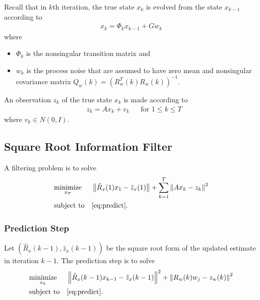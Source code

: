 \documentclass[microtype]{gtpart}     %
\theoremstyle{definition}
\newcommand{\norm}[1]{\left\lVert#1\right\rVert}
\begin{document}
Recall that in $k$th iteration, the true state $x_k$ is evolved from the state $x_{k-1}$ according to
\begin{align}
x_k = \Phi_k x_{k-1} + Gw_k \label{eq:predict}
\end{align}
where
\begin{itemize}
	\item $\Phi_k$ is the nonsingular transition matrix and
	\item $w_k$ is the process noise that are assumed to have zero mean and nonsingular covariance matrix 
	$Q_w(k)=(R^T_w(k)R_w(k))^{-1}$.
\end{itemize}
An observation $z_k$ of the true state $x_k$ is made according to
\begin{align*}
	&z_k = A x_k + v_k & &\text{for } 1\leq k \leq T
\end{align*}
where $v_k \in N(0, I)$.

\subsection{Square Root Information Filter}

A filtering problem is to solve
\begin{align*}
& \underset{x_T}{\text{minimize}} & & \norm{\tilde{R}_x(1)x_1 - \tilde{z}_x(1)} + \sum_{k=1}^{T}\norm{Ax_k - z_k}^2 \\
& \text{subject to} & & \autoref{eq:predict}.
\end{align*}

\subsubsection{Prediction Step}

Let $(\hat{R}_x(k-1), \hat{z}_x(k-1))$ be the square root form of the updated estimate in iteration $k-1$.
The prediction step is to solve
\begin{align*}
	& \underset{x_k}{\text{minimize}} & &\norm{\hat{R}_x(k-1)x_{k-1} - \hat{z}_x(k-1)}^2 + \norm{R_w(k)w_j - z_w(k)}^2 \\
	& \text{subject to} & & \autoref{eq:predict}.
\end{align*}
\end{document}
